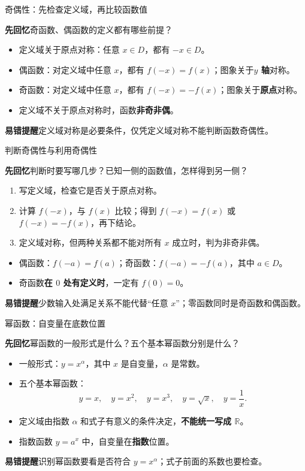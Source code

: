 \documentclass[UTF8,10pt,aspectratio=169]{ctexbeamer}
\newcommand{\Recall}[1]{\par\noindent\textcolor{KnowledgeBlue}{\textbf{先回忆}\quad #1}\par\vspace{0.3cm}}
\newcommand{\Pitfall}[1]{\par\vspace{0.22cm}\noindent\textbf{易错提醒}\quad #1\par}
\begin{document}
\begin{frame}[t]{奇偶性：先检查定义域，再比较函数值}
\large
\Recall{奇函数、偶函数的定义都有哪些前提？}
\pause
\begin{itemize}
  \item 定义域关于原点对称：任意 $x\in D$，都有 $-x\in D$。
  \item 偶函数：对定义域中任意 $x$，都有 $f(-x)=f(x)$；图象关于\textbf{$y$ 轴}对称。
  \item 奇函数：对定义域中任意 $x$，都有 $f(-x)=-f(x)$；图象关于\textbf{原点}对称。
  \item 定义域不关于原点对称时，函数\textbf{非奇非偶}。
\end{itemize}
\Pitfall{定义域对称是必要条件，仅凭定义域对称不能判断函数奇偶性。}
\end{frame}

\begin{frame}[t]{判断奇偶性与利用奇偶性}
\large
\Recall{判断时要写哪几步？已知一侧的函数值，怎样得到另一侧？}
\pause
\begin{enumerate}
  \item 写定义域，检查它是否关于原点对称。
  \item 计算 $f(-x)$，与 $f(x)$ 比较；得到 $f(-x)=f(x)$ 或 $f(-x)=-f(x)$，再下结论。
  \item 定义域对称，但两种关系都不能对所有 $x$ 成立时，判为非奇非偶。
\end{enumerate}
\begin{itemize}
  \item 偶函数：$f(-a)=f(a)$；奇函数：$f(-a)=-f(a)$，其中 $a\in D$。
  \item 奇函数\textbf{在 $0$ 处有定义时}，一定有 $f(0)=0$。
\end{itemize}
\Pitfall{少数输入处满足关系不能代替“任意 $x$”；零函数同时是奇函数和偶函数。}
\end{frame}

\begin{frame}[t]{幂函数：自变量在底数位置}
\large
\Recall{幂函数的一般形式是什么？五个基本幂函数分别是什么？}
\pause
\begin{itemize}
  \item 一般形式：$y=x^\alpha$，其中 $x$ 是自变量，$\alpha$ 是常数。
  \item 五个基本幂函数：
  \[
    y=x,\quad y=x^2,\quad y=x^3,\quad y=\sqrt{x},\quad y=\frac1x.
  \]
  \item 定义域由指数 $\alpha$ 和式子有意义的条件决定，\textbf{不能统一写成 $\mathbb R$}。
  \item 指数函数 $y=a^x$ 中，自变量在\textbf{指数}位置。
\end{itemize}
\Pitfall{识别幂函数要看是否符合 $y=x^\alpha$；式子前面的系数也要检查。}
\end{frame}
\end{document}
